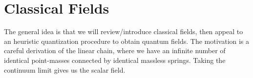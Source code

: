 \chapter{Classical Fields}

\M
The general idea is that we will review/introduce classical fields, then
appeal to an heuristic quantization procedure to obtain quantum fields.
The motivation is a careful derivation of the linear chain, where we
have an infinite number of identical point-masses connected by identical
massless springs. Taking the continuum limit gives us the scalar field.

